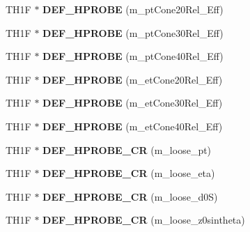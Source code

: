\begin{DoxyCompactItemize}
\item 
\hypertarget{classHistos__Fake_a3e8c0dce2b2cb8d52d5a57e986c7dec5}{
TH1F $\ast$ {\bfseries DEF\_\-HPROBE} (m\_\-ptCone20Rel\_\-Eff)}
\label{classHistos__Fake_a3e8c0dce2b2cb8d52d5a57e986c7dec5}

\item 
\hypertarget{classHistos__Fake_ae119041a972d7e4f801d5b086ad122d7}{
TH1F $\ast$ {\bfseries DEF\_\-HPROBE} (m\_\-ptCone30Rel\_\-Eff)}
\label{classHistos__Fake_ae119041a972d7e4f801d5b086ad122d7}

\item 
\hypertarget{classHistos__Fake_acb5e4186d35600f0ca0ef32abca56301}{
TH1F $\ast$ {\bfseries DEF\_\-HPROBE} (m\_\-ptCone40Rel\_\-Eff)}
\label{classHistos__Fake_acb5e4186d35600f0ca0ef32abca56301}

\item 
\hypertarget{classHistos__Fake_a62f334200ee96495d63b751822edf175}{
TH1F $\ast$ {\bfseries DEF\_\-HPROBE} (m\_\-etCone20Rel\_\-Eff)}
\label{classHistos__Fake_a62f334200ee96495d63b751822edf175}

\item 
\hypertarget{classHistos__Fake_ab6bc2e3720b736af4f8f084b94856de0}{
TH1F $\ast$ {\bfseries DEF\_\-HPROBE} (m\_\-etCone30Rel\_\-Eff)}
\label{classHistos__Fake_ab6bc2e3720b736af4f8f084b94856de0}

\item 
\hypertarget{classHistos__Fake_ac15661c7ae2fa1f8cbf8353f44624227}{
TH1F $\ast$ {\bfseries DEF\_\-HPROBE} (m\_\-etCone40Rel\_\-Eff)}
\label{classHistos__Fake_ac15661c7ae2fa1f8cbf8353f44624227}

\item 
\hypertarget{classHistos__Fake_acc59e33f9bb4c98f0b487a4d81199e77}{
TH1F $\ast$ {\bfseries DEF\_\-HPROBE\_\-CR} (m\_\-loose\_\-pt)}
\label{classHistos__Fake_acc59e33f9bb4c98f0b487a4d81199e77}

\item 
\hypertarget{classHistos__Fake_ad10c534e0702d4f6937030b499766188}{
TH1F $\ast$ {\bfseries DEF\_\-HPROBE\_\-CR} (m\_\-loose\_\-eta)}
\label{classHistos__Fake_ad10c534e0702d4f6937030b499766188}

\item 
\hypertarget{classHistos__Fake_a60f00de6d6b808b029850b92753159c7}{
TH1F $\ast$ {\bfseries DEF\_\-HPROBE\_\-CR} (m\_\-loose\_\-d0S)}
\label{classHistos__Fake_a60f00de6d6b808b029850b92753159c7}

\item 
\hypertarget{classHistos__Fake_aefff31de0b1486bec81b5d91eb89066a}{
TH1F $\ast$ {\bfseries DEF\_\-HPROBE\_\-CR} (m\_\-loose\_\-z0sintheta)}
\label{classHistos__Fake_aefff31de0b1486bec81b5d91eb89066a}


\end{DoxyCompactItemize}
